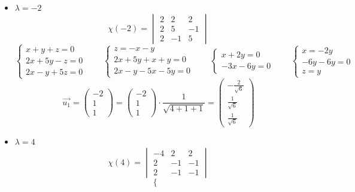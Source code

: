 \begin{itemize}
	\item $ \lambda = -2 $
    $$ \chi(-2) =
    \begin{vmatrix}
    	2 & 2 & 2 \\
        2 & 5 & -1 \\
        2 & -1 & 5
    \end{vmatrix} $$
    $$
    \begin{cases}
    	x + y + z = 0 \\
        2x + 5y - z = 0 \\
        2x - y + 5z = 0
    \end{cases} \qquad
    \begin{cases}
    	z = -x - y \\
        2x + 5y + x + y = 0 \\
        2x - y - 5x - 5y = 0
    \end{cases} \qquad
    \begin{cases}
    	x + 2y = 0 \\
        -3x - 6y = 0
    \end{cases} \qquad
    \begin{cases}
    	x = -2y \\
        -6y - 6y = 0 \\
        z = y
    \end{cases} $$
    $$ \vec{u_1} =
    \begin{pmatrix}
    	-2 \\
        1 \\
        1
    \end{pmatrix} =
    \begin{pmatrix}
    	-2 \\
        1 \\
        1
    \end{pmatrix} \cdot \frac1{\sqrt{4 + 1 + 1}} =
    \begin{pmatrix}
        -\frac2{\sqrt6} \\
        \frac1{\sqrt6} \\
        \frac1{\sqrt6}
    \end{pmatrix} $$
    \item $ \lambda = 4 $
    $$ \chi(4) =
    \begin{vmatrix}
    	-4 & 2 & 2 \\
        2 & -1 & -1 \\
        2 & -1 & -1
    \end{vmatrix} $$
    $$
    \begin{cases}

\end{cases}$$
\end{itemize}
